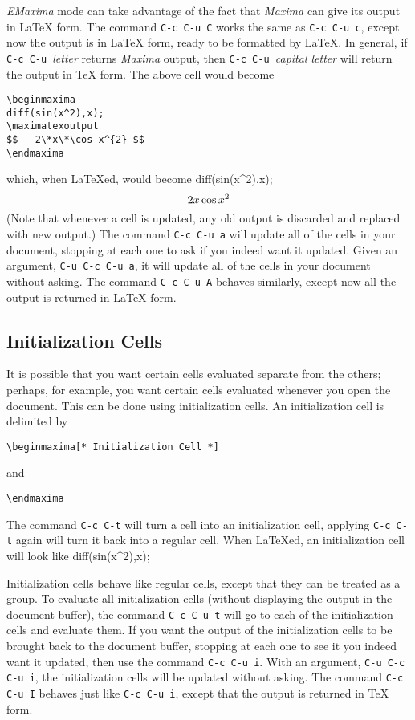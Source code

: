 \documentclass{article}
\newcommand{\emx}{\textsl{\sffamily EMaxima}}
\newcommand{\mx}{\textsl{\sffamily Maxima}}
\begin{document}
\emx{} mode can take advantage of the fact that \mx{} can give its
output in \LaTeX{} form.  The command \texttt{C-c C-u C}
works the same as \texttt{C-c C-u c}, except now the output is in \LaTeX{}
form, ready to be formatted by \LaTeX{}.  In general, if 
\texttt{C-c C-u }\textsl{letter} returns \mx{} output, then
\texttt{C-c C-u }\textsl{capital letter} will return the output in
\TeX{} form.  The above cell would become
\begin{verbatim}
\beginmaxima
diff(sin(x^2),x);
\maximatexoutput
$$   2\*x\*\cos x^{2} $$
\endmaxima
\end{verbatim}
\noindent
which, when \LaTeX{}ed, would become
\beginmaxima
diff(sin(x^2),x);
\maximatexoutput
\[   2\*x\*\cos x^{2} \]
\endmaxima
\noindent
(Note that whenever a cell is updated, any old output is discarded and
replaced with new output.)  The command \texttt{C-c C-u a} will update all
of the cells in your document, 
stopping at each one to ask if you indeed want it updated.  Given an
argument, \texttt{C-u C-c C-u a}, it will update all of the cells in your
document without asking.  The command \texttt{C-c C-u A} behaves
similarly, except now all the output is returned in \LaTeX{}  form.

\subsection{Initialization Cells}

\noindent
It is possible that you want certain cells evaluated separate from the
others; perhaps, for example, you want certain cells evaluated whenever
you open the document.  This can be done using initialization cells.
An initialization cell is delimited by
\begin{verbatim}
\beginmaxima[* Initialization Cell *]
\end{verbatim}
\noindent
and
\begin{verbatim}
\endmaxima
\end{verbatim}
\noindent
The command \texttt{C-c C-t} will turn a cell into
an initialization cell, applying \texttt{C-c C-t} again will turn it
back into a regular cell.  
When \LaTeX{}ed, an initialization cell will look like
diff(sin(x^2),x);
\endmaxima

Initialization cells behave like regular
cells, except that they can be treated as a group.
To evaluate all initialization cells (without displaying the output in
the document buffer), the
command \texttt{C-c C-u t} will go to each of the
initialization cells and evaluate them.
If you want the output of the initialization cells to be brought back 
to the document buffer,  stopping at each one to see it
you indeed want it updated, then use the command \texttt{C-c C-u i}.
With an argument, \texttt{C-u C-c C-u i}, the
initialization cells will be updated without asking.   The command 
\texttt{C-c C-u I} behaves just like \texttt{C-c C-u i},
except that the output is returned in \TeX{} form.
\end{document}
